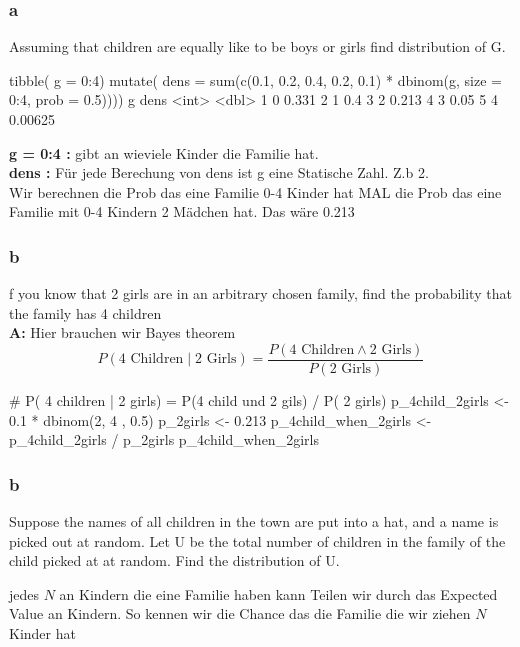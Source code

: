 \subsubsection{a}
Assuming that children are equally like to be boys or girls find
distribution of G.
\begin{rcode}{1}
tibble(
  g = 0:4) %
  mutate(
    dens = sum(c(0.1, 0.2, 0.4, 0.2, 0.1) * 
                 dbinom(g, size = 0:4,
                 prob = 0.5))))
      g    dens
  <int>   <dbl>
1     0 0.331  
2     1 0.4    
3     2 0.213  
4     3 0.05   
5     4 0.00625
\end{rcode}
\textbf{g = 0:4 :} gibt an wieviele Kinder die Familie hat.\\
\textbf{dens :} Für jede Berechung von dens ist g eine Statische Zahl. Z.b 2.\\
Wir berechnen die Prob das eine Familie 0-4 Kinder hat MAL die Prob das eine Familie mit 0-4 Kindern 2 Mädchen hat. Das wäre 0.213
\subsubsection{b}
f you know that 2 girls are in an arbitrary chosen family, find the
probability that the family has 4 children\\
\textbf{A:}
Hier brauchen wir Bayes theorem
$$
P(\text{4 Children}\mid \text{2 Girls}) = \frac{P(\text{4 Children} \land\text{2 Girls})}{P(\text{2 Girls})}
$$
\begin{rcode}{1}
# P( 4 children | 2 girls) = P(4 child und 2 gils) / P( 2 girls)
p_4child_2girls <- 0.1 * dbinom(2, 4 , 0.5)
p_2girls <- 0.213
p_4child_when_2girls <- p_4child_2girls / p_2girls
p_4child_when_2girls
\end{rcode}
\subsubsection{b}
Suppose the names of all children in the town are put into a hat,
and a name is picked out at random. Let U be the total number
of children in the family of the child picked at at random. Find
the distribution of U.
jedes $N$ an Kindern die eine Familie haben kann Teilen wir durch das Expected Value an Kindern. So kennen wir die Chance das die Familie die wir ziehen $N$ Kinder hat